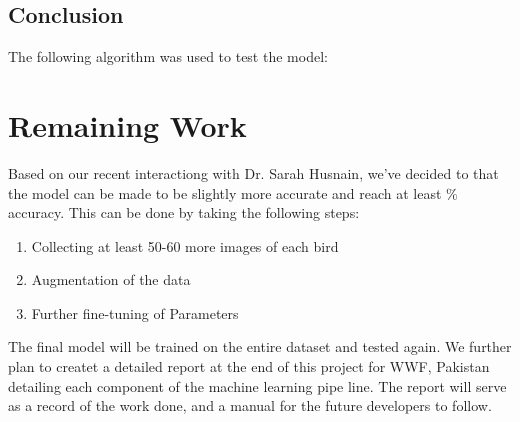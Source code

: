 \documentclass{article}
\begin{document}
    \subsection*{Conclusion}
    The following algorithm was used to test the model:


    \section*{Remaining Work}
    
    Based on our recent interactiong with Dr. Sarah Husnain, we've decided to that the model can be made to be slightly more accurate and reach at least $\%$ accuracy. This can be done by taking the following steps:
    \begin{enumerate}
        \item Collecting at least 50-60 more images of each bird
        \item Augmentation of the data
        \item Further fine-tuning of Parameters
    \end{enumerate}
    The final model will be trained on the entire dataset and tested again. We further plan to createt a detailed report at the end of this project for WWF, Pakistan detailing each component of the machine learning pipe line. The report will serve as a record of the work done, and a manual for the future developers to follow.
    
    
\end{document}
